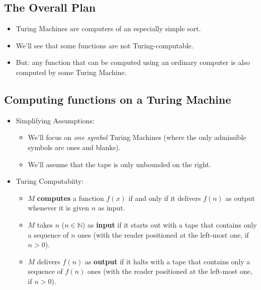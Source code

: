 \documentclass[12pt]{extarticle}
\begin{document}
\subsection{The Overall Plan}

\begin{itemize}

\item Turing Machines are computers of an especially simple sort.

\item We'll see that some functions are not Turing-computable.

\item But: any function that can be computed using an ordinary computer is also computed by some Turing Machine. 

\end{itemize}




\subsection{Computing functions on a Turing Machine}

\begin{itemize}

\item Simplifying Assumptions:
\begin{itemize}

\item We'll focus on \emph{one symbol} Turing Machines (where the only admissible symbols are ones and blanks).

\item We'll assume that the tape is only unbounded on the right.


\end{itemize}


\item Turing Computabiity:
\begin{itemize}

\item $M$ \textbf{computes} a function \(f(x)\) if and only if it delivers \(f(n)\) as output whenever it is given $n$ as input.


\item $M$ takes \(n\) ($n \in \mathbb{N}$) as \textbf{input} if it starts out with a tape that contains only a sequence of \(n\) ones (with the reader positioned at the left-most one, if $n > 0$).

\item  $M$ delivers \(f(n)\) as \textbf{output} if it halts with a tape that contains only a sequence of \(f(n)\) ones (with the reader positioned at the left-most one, if $n > 0$).


\end{itemize}
\end{itemize}
\end{document}
